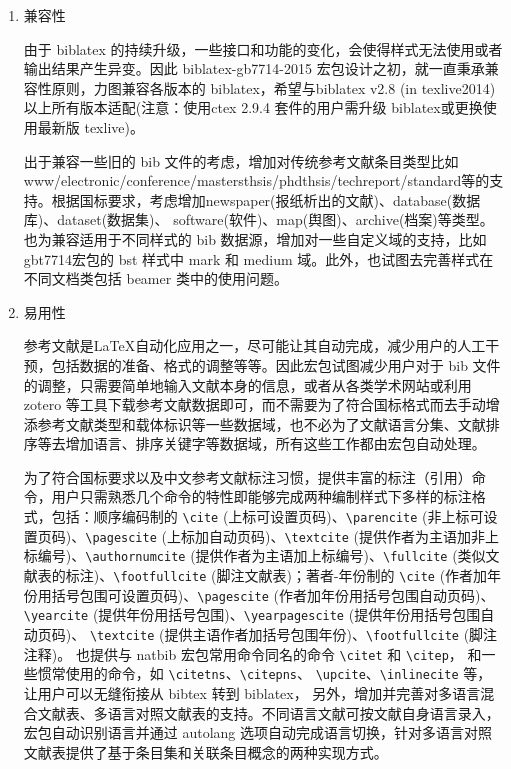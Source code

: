 \documentclass[11pt]{article} %
\begin{document}
\begin{enumerate}
  \item 兼容性

由于 biblatex 的持续升级，一些接口和功能的变化，会使得样式无法使用或者输出结果产生异变。因此 biblatex-gb7714-2015 宏包设计之初，就一直秉承兼容性原则，力图兼容各版本的 biblatex，希望与biblatex v2.8 (in texlive2014) 以上所有版本适配(注意：使用ctex 2.9.4 套件的用户需升级 biblatex或更换使用最新版 texlive)。

出于兼容一些旧的 bib 文件的考虑，增加对传统参考文献条目类型比如www/electronic/conference/mastersthsis/phdthsis/techreport/standard等的支持。根据国标要求，考虑增加newspaper(报纸析出的文献)、database(数据库)、dataset(数据集)、 software(软件)、map(舆图)、archive(档案)等类型。也为兼容适用于不同样式的 bib 数据源，增加对一些自定义域的支持，比如gbt7714宏包的 bst 样式中 mark 和 medium 域。此外，也试图去完善样式在不同文档类包括 beamer 类中的使用问题。

  \item 易用性

参考文献是\LaTeX{}自动化应用之一，尽可能让其自动完成，减少用户的人工干预，包括数据的准备、格式的调整等等。因此宏包试图减少用户对于 bib 文件的调整，只需要简单地输入文献本身的信息，或者从各类学术网站或利用 zotero 等工具下载参考文献数据即可，而不需要为了符合国标格式而去手动增添参考文献类型和载体标识等一些数据域，也不必为了文献语言分集、文献排序等去增加语言、排序关键字等数据域，所有这些工作都由宏包自动处理。

为了符合国标要求以及中文参考文献标注习惯，提供丰富的标注（引用）命令，用户只需熟悉几个命令的特性即能够完成两种编制样式下多样的标注格式，包括：顺序编码制的 \verb|\cite| (上标可设置页码)、\verb|\parencite| (非上标可设置页码)、\verb|\pagescite| (上标加自动页码)、\verb|\textcite| (提供作者为主语加非上标编号)、\verb|\authornumcite| (提供作者为主语加上标编号)、\verb|\fullcite| (类似文献表的标注)、\verb|\footfullcite| (脚注文献表)；著者-年份制的 \verb|\cite| (作者加年份用括号包围可设置页码)、\verb|\pagescite| (作者加年份用括号包围自动页码)、
\verb|\yearcite| (提供年份用括号包围)、\verb|\yearpagescite| (提供年份用括号包围自动页码)、
\verb|\textcite| (提供主语作者加括号包围年份)、\verb|\footfullcite| (脚注注释)。
也提供与 natbib 宏包常用命令同名的命令 \verb|\citet| 和 \verb|\citep|，
和一些惯常使用的命令，如 \verb|\citetns|、\verb|\citepns|、
\verb|\upcite|、\verb|\inlinecite| 等，让用户可以无缝衔接从 bibtex 转到 biblatex，
另外，增加并完善对多语言混合文献表、多语言对照文献表的支持。不同语言文献可按文献自身语言录入，宏包自动识别语言并通过 autolang 选项自动完成语言切换，针对多语言对照文献表提供了基于条目集和关联条目概念的两种实现方式。



\end{enumerate}
\end{document}
